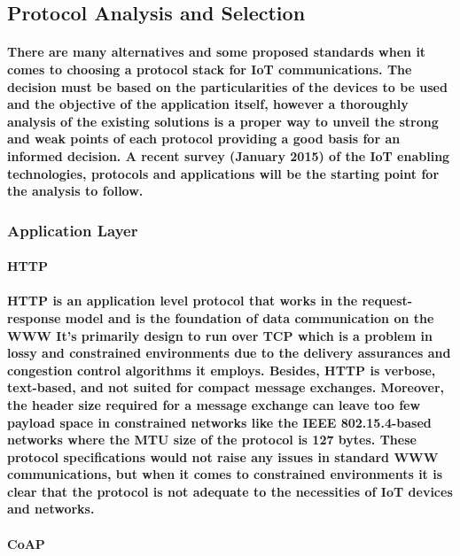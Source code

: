 \subsection{Protocol Analysis and Selection}

\paragraph{
	There are many alternatives and some proposed standards when it comes to choosing a protocol stack for \ac{IoT} communications. The decision must be based on the particularities of the devices to be used and the objective of the application itself, however a thoroughly analysis of the existing solutions is a proper way to unveil the strong and weak points of each protocol providing a good basis for an informed decision. A recent survey (January 2015) \cite{Al-Fuqaha2015} of the \ac{IoT} enabling technologies, protocols and applications will be the starting point for the analysis to follow.
}

\subsubsection{Application Layer}

\paragraph{\textbf{\ac{HTTP}}}
\paragraph{
	\ac{HTTP} is an application level protocol that works in the request-response model and is the foundation of data communication on the \ac{WWW} It's primarily design to run over \ac{TCP} which is a problem in lossy and constrained environments due to the delivery assurances and congestion control algorithms it employs. Besides, {HTTP} is verbose, text-based, and not suited for compact message exchanges. Moreover, the header size required for a message exchange can leave too few payload space in constrained networks like the IEEE 802.15.4-based networks where the \ac{MTU} size of the protocol is 127 bytes. These protocol specifications would not raise any issues in standard \ac{WWW} communications, but when it comes to constrained environments it is clear that the protocol is not adequate to the necessities of \ac{IoT} devices and networks.
}

\paragraph{\textbf{\ac{CoAP}}}
